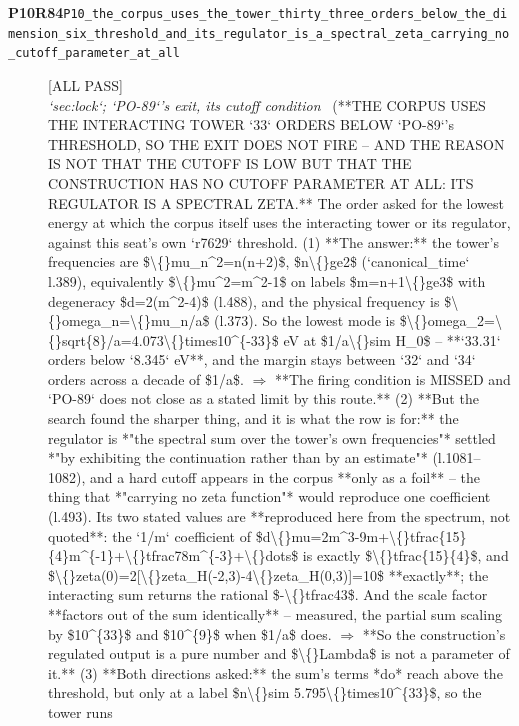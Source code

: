 \begin{description}
\item[\textbf{P10R84}\quad\texttt{P10\_the\_corpus\_uses\_the\_tower\_thirty\_three\_orders\_below\_the\_dimension\_six\_threshold\_and\_its\_regulator\_is\_a\_spectral\_zeta\_carrying\_no\_cutoff\_parameter\_at\_all}]\hfill\textsf{[ALL PASS]}\\
\textit{`sec:lock`; `PO-89`'s exit, its cutoff condition} \ (**THE CORPUS USES THE INTERACTING TOWER `33` ORDERS BELOW `PO-89`'s THRESHOLD, SO THE EXIT DOES NOT FIRE -- AND THE REASON IS NOT THAT THE CUTOFF IS LOW BUT THAT THE CONSTRUCTION HAS NO CUTOFF PARAMETER AT ALL: ITS REGULATOR IS A SPECTRAL ZETA.** The order asked for the lowest energy at which the corpus itself uses the interacting tower or its regulator, against this seat's own `r7629` threshold. (1) **The answer:** the tower's frequencies are \$\textbackslash\{\}mu\_n\textasciicircum{}2=n(n+2)\$, \$n\textbackslash\{\}ge2\$ (`canonical\_time` l.389), equivalently \$\textbackslash\{\}mu\textasciicircum{}2=m\textasciicircum{}2-1\$ on labels \$m=n+1\textbackslash\{\}ge3\$ with degeneracy \$d=2(m\textasciicircum{}2-4)\$ (l.488), and the physical frequency is \$\textbackslash\{\}omega\_n=\textbackslash\{\}mu\_n/a\$ (l.373). So the lowest mode is \$\textbackslash\{\}omega\_2=\textbackslash\{\}sqrt\{8\}/a=4.073\textbackslash\{\}times10\textasciicircum{}\{-33\}\$ eV at \$1/a\textbackslash\{\}sim H\_0\$ -- **`33.31` orders below `8.345` eV**, and the margin stays between `32` and `34` orders across a decade of \$1/a\$. \ensuremath{\Rightarrow} **The firing condition is MISSED and `PO-89` does not close as a stated limit by this route.** (2)  **But the search found the sharper thing, and it is what the row is for:** the regulator is *"the spectral sum over the tower's own frequencies"* settled *"by exhibiting the continuation rather than by an estimate"* (l.1081--1082), and a hard cutoff appears in the corpus **only as a foil** -- the thing that *"carrying no zeta function"* would reproduce one coefficient (l.493). Its two stated values are **reproduced here from the spectrum, not quoted**: the `1/m` coefficient of \$d\textbackslash\{\}mu=2m\textasciicircum{}3-9m+\textbackslash\{\}tfrac\{15\}\{4\}m\textasciicircum{}\{-1\}+\textbackslash\{\}tfrac78m\textasciicircum{}\{-3\}+\textbackslash\{\}dots\$ is exactly \$\textbackslash\{\}tfrac\{15\}\{4\}\$, and \$\textbackslash\{\}zeta(0)=2[\textbackslash\{\}zeta\_H(-2,3)-4\textbackslash\{\}zeta\_H(0,3)]=10\$ **exactly**; the interacting sum returns the rational \$-\textbackslash\{\}tfrac43\$. And the scale factor **factors out of the sum identically** -- measured, the partial sum scaling by \$10\textasciicircum{}\{33\}\$ and \$10\textasciicircum{}\{9\}\$ when \$1/a\$ does. \ensuremath{\Rightarrow} **So the construction's regulated output is a pure number and \$\textbackslash\{\}Lambda\$ is not a parameter of it.** (3) **Both directions asked:** the sum's terms *do* reach above the threshold, but only at a label \$n\textbackslash\{\}sim 5.795\textbackslash\{\}times10\textasciicircum{}\{33\}\$, so the tower runs 
\end{description}
